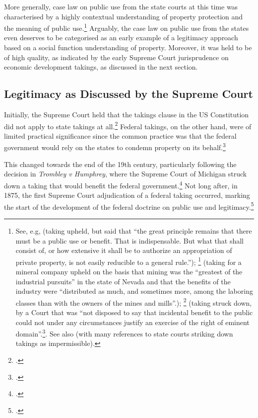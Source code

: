 More generally, case law on public use from the state courts at this time was characterised by a highly contextual understanding of property protection and the meaning of public use.\footnote{See, e.g, \cite{scudder32} (taking upheld, but said that ``the great principle remains that there must be a public use or benefit. That is indispensable. But what that shall consist of, or how extensive it shall be to authorize an appropriation of private property, is not easily reducible to a general rule.''); \footcite[409]{seawell76} (taking for a mineral company upheld on the basis that mining was the ``greatest of the industrial pursuits'' in the state of Nevada and that the benefits of the industry were ``distributed as much, and sometimes more, among the laboring classes than with the owners of the mines and mills''.); \footcite[337]{ryerson77} (taking struck down, by a Court that was ``not disposed to say that incidental benefit to the public could not under any circumstances justify an exercise of the right of eminent domain''.\footcite[337]{ryerson77}. See also \cite{gray11} (with many references to state courts striking down takings as impermissible).} Arguably, the case law on public use from the states even deserves to be categorised as an early example of a legitimacy approach based on a social function understanding of property. Moreover, it was held to be of high quality, as indicated by the early Supreme Court jurisprudence on economic development takings, as discussed in the next section.

\subsection{Legitimacy as Discussed by the Supreme Court}\label{sec:3:3:1}

Initially, the Supreme Court held that the takings clause in the US Constitution did not apply to state takings at all.\footcite{barron33} Federal takings, on the other hand, were of limited practical significance since the common practice was that the federal government would rely on the states to condemn property on its behalf.\footcite[30]{meidinger80}

This changed towards the end of the 19th century, particularly following the decision in {\it Trombley v Humphrey}, where the Supreme Court of Michigan struck down a taking that would benefit the federal government.\footcite{trombley71} Not long after, in 1875, the first Supreme Court adjudication of a federal taking occurred, marking the start of the development of the federal doctrine on public use and legitimacy.\footcite{kohl75} 

